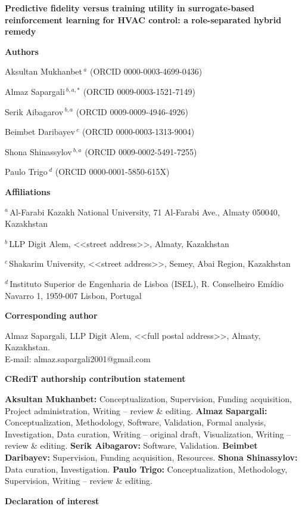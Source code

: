 \documentclass[12pt,a4paper]{article}
\begin{document}
{\large\bfseries Predictive fidelity versus training utility in surrogate-based reinforcement
learning for HVAC control: a role-separated hybrid remedy\par}

\vspace{4pt}
\textbf{Authors}

Aksultan Mukhanbet\,$^{a}$ (ORCID 0000-0003-4699-0436)

Almaz Sapargali\,$^{b,a,\ast}$ (ORCID 0009-0003-1521-7149)

Serik Aibagarov\,$^{b,a}$ (ORCID 0009-0009-4946-4926)

Beimbet Daribayev\,$^{c}$ (ORCID 0000-0003-1313-9004)

Shona Shinassylov\,$^{b,a}$ (ORCID 0009-0002-5491-7255)

Paulo Trigo\,$^{d}$ (ORCID 0000-0001-5850-615X)

\textbf{Affiliations}

$^{a}$\,Al-Farabi Kazakh National University, 71 Al-Farabi Ave., Almaty 050040, Kazakhstan

$^{b}$\,LLP Digit Alem, <<street address>>, Almaty, Kazakhstan

$^{c}$\,Shakarim University, <<street address>>, Semey, Abai Region, Kazakhstan

$^{d}$\,Instituto Superior de Engenharia de Lisboa (ISEL), R. Conselheiro Em\'idio Navarro 1,
1959-007 Lisbon, Portugal

\textbf{Corresponding author}

Almaz Sapargali, LLP Digit Alem, <<full postal address>>, Almaty, Kazakhstan.\\
E-mail: almaz.sapargali2001@gmail.com

\vspace{6pt}
\textbf{CRediT authorship contribution statement}

\textbf{Aksultan Mukhanbet:} Conceptualization, Supervision, Funding acquisition, Project
administration, Writing -- review \& editing.
\textbf{Almaz Sapargali:} Conceptualization, Methodology, Software, Validation, Formal analysis,
Investigation, Data curation, Writing -- original draft, Visualization, Writing -- review \& editing.
\textbf{Serik Aibagarov:} Software, Validation.
\textbf{Beimbet Daribayev:} Supervision, Funding acquisition, Resources.
\textbf{Shona Shinassylov:} Data curation, Investigation.
\textbf{Paulo Trigo:} Conceptualization, Methodology, Supervision, Writing -- review \& editing.

\textbf{Declaration of interest}
\end{document}
